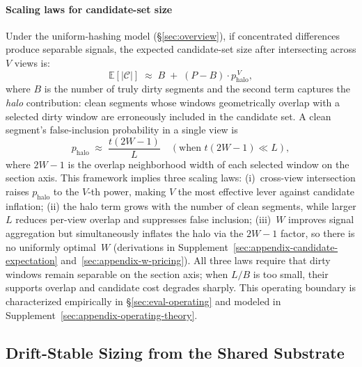\paragraph{Scaling laws for candidate-set size}
Under the uniform-hashing model (\S\ref{sec:overview}),
if concentrated differences produce separable signals,
the expected candidate-set size after intersecting across $V$
views is:
\begin{equation}\label{eq:cand-expectation}
\mathbb{E}[|\mathcal{C}|]
  \;\approx\; B \;+\; (P-B)\cdot p_{\mathrm{halo}}^{\,V},
\end{equation}
where $B$ is the number of truly dirty segments and the second
term captures the \emph{halo} contribution: clean segments whose
windows geometrically overlap with a selected dirty window are
erroneously included in the candidate set.
A clean segment's false-inclusion probability in a single view
is
\begin{equation}\label{eq:halo-prob}
p_{\mathrm{halo}}
  \;\approx\; \frac{t(2W-1)}{L}
  \quad(\text{when } t(2W-1) \ll L),
\end{equation}
where $2W{-}1$ is the overlap neighborhood width of each
selected window on the section axis.
This framework implies three scaling laws:
(i)~cross-view intersection raises $p_{\mathrm{halo}}$ to the
$V$-th power, making $V$ the most effective lever against
candidate inflation;
(ii) the halo term grows with the number of clean segments,
while larger $L$ reduces per-view overlap and suppresses false
inclusion;
(iii)~$W$ improves signal aggregation but simultaneously
inflates the halo via the $2W{-}1$ factor, so there is no
uniformly optimal~$W$
(derivations in Supplement~\ref{sec:appendix-candidate-expectation}
and~\ref{sec:appendix-w-pricing}).
All three laws require that dirty windows remain separable
on the section axis; when $L/B$ is too small, their supports
overlap and candidate cost degrades sharply.
This operating boundary is characterized empirically in
\S\ref{sec:eval-operating} and modeled in
Supplement~\ref{sec:appendix-operating-theory}.


\subsection{Drift-Stable Sizing from the Shared Substrate}
\label{sec:dedrift}

